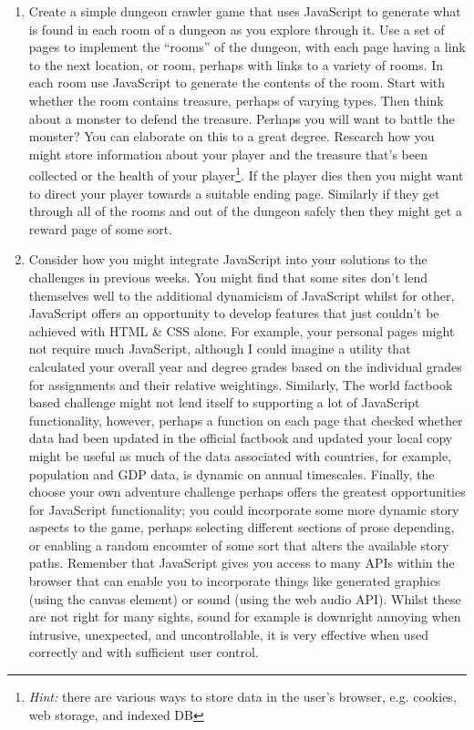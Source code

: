 \documentclass[10pt, a4paper]{article}
\begin{document}
\begin{enumerate}
\item Create a simple dungeon crawler game that uses JavaScript to generate what is found in each room of a dungeon as you explore through it. Use a set of pages to implement the ``rooms'' of the dungeon, with each page having a link to the next location, or room, perhaps with links to a variety of rooms. In each room use JavaScript to generate the contents of the room. Start with whether the room contains treasure, perhaps of varying types. Then think about a monster to defend the treasure. Perhaps you will want to battle the monster? You can elaborate on this to a great degree. Research how you might store information about your player and the treasure that's been collected or the health of your player\footnote{\emph{Hint:} there are various ways to store data in the user's browser, e.g. cookies, web storage, and indexed DB}. If the player dies then you might want to direct your player towards a suitable ending page. Similarly if they get through all of the rooms and out of the dungeon safely then they might get a reward page of some sort.
\item Consider how you might integrate JavaScript into your solutions to the challenges in previous weeks. You might find that some sites don't lend themselves well to the additional dynamicism of JavaScript whilst for other, JavaScript offers an opportunity to develop features that just couldn't be achieved with HTML \& CSS alone. For example, your personal pages might not require much JavaScript, although I could imagine a utility that calculated your overall year and degree grades based on the individual grades for assignments and their relative weightings. Similarly, The world factbook based challenge might not lend itself to supporting a lot of JavaScript functionality, however, perhaps a function on each page that checked whether data had been updated in the official factbook and updated your local copy might be useful as much of the data associated with countries, for example, population and GDP data, is dynamic on annual timescales. Finally, the choose your own adventure challenge perhaps offers the greatest opportunities for JavaScript functionality; you could incorporate some more dynamic story aspects to the game, perhaps selecting different sections of prose depending, or enabling a random encounter of some sort that alters the available story paths. Remember that JavaScript gives you access to many APIs within the browser that can enable you to incorporate things like generated graphics (using the canvas element) or sound (using the web audio API). Whilst these are not right for many sights, sound for example is downright annoying when intrusive, unexpected, and uncontrollable, it is very effective when used correctly and with sufficient user control.
\end{enumerate}
\end{document}
